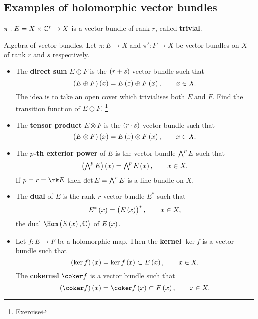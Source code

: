 \pagebreak

\subsection{Examples of holomorphic vector bundles}

\begin{example}
$ \pi : E = X \times \mathbb{C}^r \to X $ is a vector bundle of rank $ r $, called \textbf{trivial}.
\end{example}

\begin{example}
Algebra of vector bundles. Let $ \pi : E \to X $ and $ \pi' : F \to X $ be vector bundles on $ X $ of rank $ r $ and $ s $ respectively.
\begin{itemize}
\item The \textbf{direct sum} $ E \oplus F $ is the $ \br{r + s} $-vector bundle such that
$$ \br{E \oplus F}\br{x} = E\br{x} \oplus F\br{x}, \qquad x \in X. $$
The idea is to take an open cover which trivialises both $ E $ and $ F $. Find the transition function of $ E \oplus F $. \footnote{Exercise}
\item The \textbf{tensor product} $ E \otimes F $ is the $ \br{r \cdot s} $-vector bundle such that
$$ \br{E \otimes F}\br{x} = E\br{x} \otimes F\br{x}, \qquad x \in X. $$
\item The \textbf{$ p $-th exterior power} of $ E $ is the vector bundle $ \textstyle\bigwedge^pE $ such that
$$ \br{\ext^pE}\br{x} = \ext^pE\br{x}, \qquad x \in X. $$
If $ p = r = \rk E $ then $ \det E = \textstyle\bigwedge^rE $ is a line bundle on $ X $.
\item The \textbf{dual} of $ E $ is the rank $ r $ vector bundle $ E^* $ such that
$$ E^*\br{x} = \br{E\br{x}}^*, \qquad x \in X, $$
the dual $ \Hom\br{E\br{x}, \CC} $ of $ E\br{x} $.
\item Let $ f : E \to F $ be a holomorphic map. Then the \textbf{kernel} $ \ker f $ is a vector bundle such that
$$ \br{\ker f}\br{x} = \ker f\br{x} \subset E\br{x}, \qquad x \in X. $$
The \textbf{cokernel} $ \coker f $ is a vector bundle such that
$$ \br{\coker f}\br{x} = \coker f\br{x} \subset F\br{x}, \qquad x \in X. $$
\end{itemize}
\end{example}



